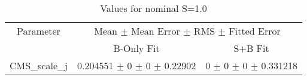 \begin{table}
\centering
\caption{Values for nominal S=1.0}
\begin{tabular}{ccc}
\toprule
Parameter & \multicolumn{2}{c}{Mean $\pm$ Mean Error $\pm$ RMS $\pm$ Fitted Error}\\
 & B-Only Fit & S+B Fit\\
\midrule
CMS\_scale\_j & \num{0.204551} $\pm$ \num{0} $\pm$ \num{0} $\pm$ \num{0.22902} & \num{0} $\pm$ \num{0} $\pm$ \num{0} $\pm$ \num{0.331218}\\
\bottomrule
\end{tabular}
\end{table}